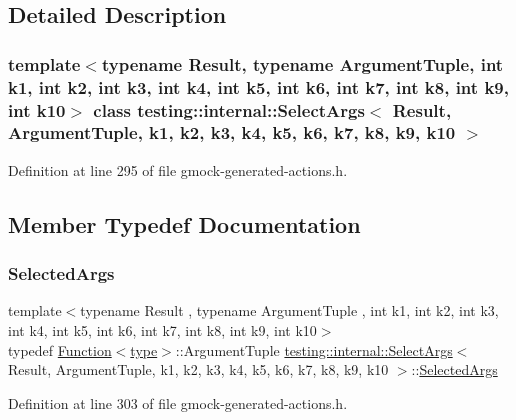 \subsection{Detailed Description}
\subsubsection*{template$<$typename Result, typename Argument\+Tuple, int k1, int k2, int k3, int k4, int k5, int k6, int k7, int k8, int k9, int k10$>$\newline
class testing\+::internal\+::\+Select\+Args$<$ Result, Argument\+Tuple, k1, k2, k3, k4, k5, k6, k7, k8, k9, k10 $>$}



Definition at line 295 of file gmock-\/generated-\/actions.\+h.



\subsection{Member Typedef Documentation}
\mbox{\label{classtesting_1_1internal_1_1SelectArgs_ad1eaa794653b3f4cefdb5c2285b418a7}} 
\subsubsection{\texorpdfstring{Selected\+Args}{SelectedArgs}}
{\footnotesize\ttfamily template$<$typename Result , typename Argument\+Tuple , int k1, int k2, int k3, int k4, int k5, int k6, int k7, int k8, int k9, int k10$>$ \\
typedef \hyperlink{structtesting_1_1internal_1_1Function}{Function}$<$\hyperlink{classtesting_1_1internal_1_1SelectArgs_a9e8d3a748637b91376acab2330d87749}{type}$>$\+::Argument\+Tuple \hyperlink{classtesting_1_1internal_1_1SelectArgs}{testing\+::internal\+::\+Select\+Args}$<$ Result, Argument\+Tuple, k1, k2, k3, k4, k5, k6, k7, k8, k9, k10 $>$\+::\hyperlink{classtesting_1_1internal_1_1SelectArgs_ad1eaa794653b3f4cefdb5c2285b418a7}{Selected\+Args}}



Definition at line 303 of file gmock-\/generated-\/actions.\+h.

\mbox{\label{classtesting_1_1internal_1_1SelectArgs_a9e8d3a748637b91376acab2330d87749}} 
